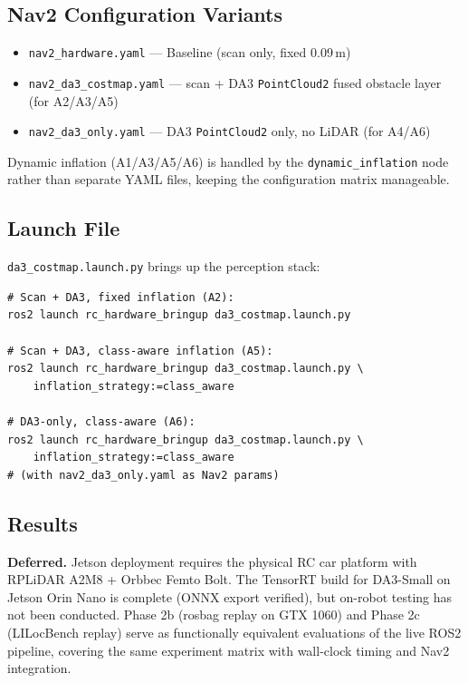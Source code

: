 \documentclass[11pt,a4paper]{article}
\begin{document}
\subsection{Nav2 Configuration Variants}

\begin{itemize}[nosep]
  \item \texttt{nav2\_hardware.yaml} --- Baseline (scan only, fixed 0.09\,m)
  \item \texttt{nav2\_da3\_costmap.yaml} --- scan + DA3 \texttt{PointCloud2}
    fused obstacle layer (for A2/A3/A5)
  \item \texttt{nav2\_da3\_only.yaml} --- DA3 \texttt{PointCloud2} only,
    no LiDAR (for A4/A6)
\end{itemize}

Dynamic inflation (A1/A3/A5/A6) is handled by the
\texttt{dynamic\_inflation} node rather than separate YAML files,
keeping the configuration matrix manageable.

\subsection{Launch File}

\texttt{da3\_costmap.launch.py} brings up the perception stack:

\begin{lstlisting}
# Scan + DA3, fixed inflation (A2):
ros2 launch rc_hardware_bringup da3_costmap.launch.py

# Scan + DA3, class-aware inflation (A5):
ros2 launch rc_hardware_bringup da3_costmap.launch.py \
    inflation_strategy:=class_aware

# DA3-only, class-aware (A6):
ros2 launch rc_hardware_bringup da3_costmap.launch.py \
    inflation_strategy:=class_aware
# (with nav2_da3_only.yaml as Nav2 params)
\end{lstlisting}

\subsection{Results}

\textbf{Deferred.}  Jetson deployment requires the physical RC car
platform with RPLiDAR A2M8 + Orbbec Femto Bolt.  The TensorRT build
for DA3-Small on Jetson Orin Nano is complete (ONNX export verified),
but on-robot testing has not been conducted.  Phase 2b (rosbag replay
on GTX 1060) and Phase 2c (LILocBench replay) serve as functionally
equivalent evaluations of the live ROS2 pipeline, covering the same
experiment matrix with wall-clock timing and Nav2 integration.
\end{document}
